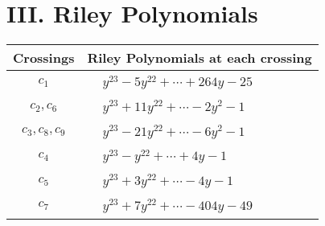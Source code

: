 \documentclass[1p]{elsarticle_modified}
\theoremstyle{definition}
\begin{document}
\centering \section*{ III. Riley Polynomials}
\begin{tabular}{m{50pt}|m{274pt}}
Crossings & \hspace{64pt}Riley Polynomials at each crossing \\
\hline $$\begin{aligned}c_{1}\end{aligned}$$&$\begin{aligned}
&y^{23}-5 y^{22}+\cdots+264 y-25
\end{aligned}$\\
\hline $$\begin{aligned}c_{2},c_{6}\end{aligned}$$&$\begin{aligned}
&y^{23}+11 y^{22}+\cdots-2 y^2-1
\end{aligned}$\\
\hline $$\begin{aligned}c_{3},c_{8},c_{9}\end{aligned}$$&$\begin{aligned}
&y^{23}-21 y^{22}+\cdots-6 y^2-1
\end{aligned}$\\
\hline $$\begin{aligned}c_{4}\end{aligned}$$&$\begin{aligned}
&y^{23}- y^{22}+\cdots+4 y-1
\end{aligned}$\\
\hline $$\begin{aligned}c_{5}\end{aligned}$$&$\begin{aligned}
&y^{23}+3 y^{22}+\cdots-4 y-1
\end{aligned}$\\
\hline $$\begin{aligned}c_{7}\end{aligned}$$&$\begin{aligned}
&y^{23}+7 y^{22}+\cdots-404 y-49
\end{aligned}$\\
\hline
\end{tabular}
\vskip 2pc
\end{document}
